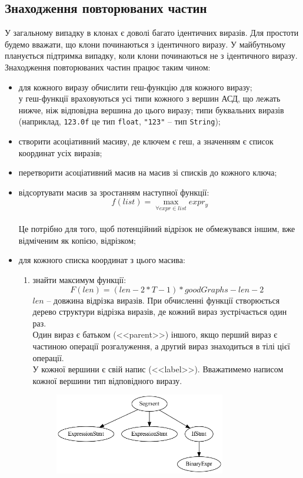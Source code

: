 \documentclass[a4paper, 14pt]{article}
\begin{document}
\subsection{Знаходження повторюваних частин}
У загальному випадку в клонах є доволі багато ідентичних виразів. Для простоти будемо вважати, що клони починаються з ідентичного виразу. У майбутньому планується підтримка випадку, коли клони починаються не з ідентичного виразу. \\
Знаходження повторюваних частин працює таким чином:
\begin{itemize}
\item для кожного виразу обчислити геш-функцію для кожного виразу;\\
у геш-функції враховуються усі типи кожного з вершин АСД, що лежать нижче, ніж відповідна вершина до цього виразу; типи буквальних виразів (наприклад, \verb|123.0f| це тип \verb|float|, \verb|"123"| -- тип \verb|String|);
\item{створити асоціативний масиву, де ключем є геш, а значенням є список координат усіх виразів;}
\item{перетворити асоціативний масив на масив зі списків до кожного ключа;}
\item{відсортувати масив за зростанням наступної функції: $$f(list)=\max_{\forall expr \in list}{expr_{y}} $$ \\
Це потрібно для того, щоб потенційний відрізок не обмежувався іншим, вже відміченим як копією, відрізком;}
\item{для кожного списка координат з цього масива: 
\begin{enumerate}[label={{\arabic*})}]
\item{знайти максимум функції: $$F(len)=(len-2*T-1)*goodGraphs-len-2$$
$len$ -- довжина відрізка виразів. При обчисленні функції створюється дерево структури відрізка виразів, де кожний вираз зустрічається один раз. \\
Один вираз є батьком (<<parent>>) іншого, якщо перший вираз є частиною операції розгалуження, а другий вираз знаходиться в тілі цієї операції. \\
У кожної вершини є свій напис (<<label>>). Вважатимемо написом кожної вершини тип відповідного виразу. \\
\begin{figure}[h]
    \centering
    \includegraphics[width=0.75\textwidth]{function_graph_example}

\end{figure}}
\end{enumerate}}
\end{itemize}
\end{document}
